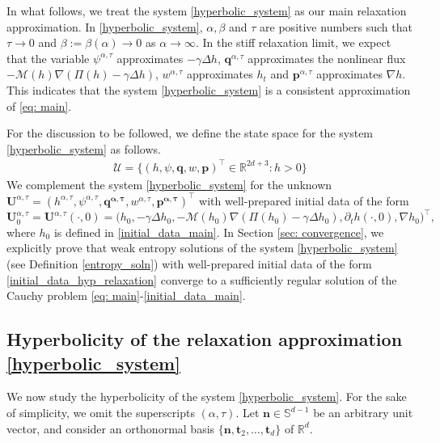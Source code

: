 \documentclass[11pt]{article}
\numberwithin{equation}{section}
\newtheorem{counter example}[theorem]{Counter Example}
\numberwithin{equation}{section}
\numberwithin{equation}{section}
\newcommand{\rel}{^{\alpha, \tau}}
\begin{document}
In what follows, we treat the system \eqref{hyperbolic_system} as our main relaxation approximation. In \eqref{hyperbolic_system}, $\alpha, \beta$ and $\tau$ are positive numbers such that $\tau\rightarrow 0$ and $\beta:=\beta(\alpha)\rightarrow 0$ as $\alpha\rightarrow \infty$. In the stiff relaxation limit, we expect that the variable $\psi^{\alpha, \tau}$ approximates $-\gamma \Delta h$, $\mathbf{q}^{\alpha, \tau}$ approximates the nonlinear flux $-\mathcal{M}(h)\nabla(\Pi(h)-\gamma \Delta h)$, $w^{\alpha, \tau}$ approximates $h_t$ and $\mathbf{p}^{\alpha, \tau}$ approximates $\nabla h$. This indicates that the system \eqref{hyperbolic_system} is a consistent approximation of \eqref{eq: main}.

For the discussion to be followed, we define the state space for the system \eqref{hyperbolic_system} as follows.
\begin{align}\label{statespace}
    \mathcal{U}=\{(h, \psi, \mathbf{q}, w, \mathbf{p})^\top \in \mathbb{R}^{2d+3}: h>0\}
\end{align}
We complement the system \eqref{hyperbolic_system} for the unknown $\mathbf{U}\rel=(h\rel, \psi\rel, \mathbf{q\rel}, w\rel, \mathbf{p\rel})^\top$ with well-prepared initial data of the form
\begin{equation}\label{initial_data_hyp_relaxation}
\mathbf U\rel_0=\mathbf U\rel(\cdot,0)=
\bigl(h_0,-\gamma\Delta h_0,-\mathcal M(h_0)\nabla(\Pi(h_0)-\gamma\Delta h_0),\partial_t h(\cdot,0),\nabla h_0\bigr)^\top,
\end{equation}
where $h_0$ is defined in \eqref{initial_data_main}. In Section \ref{sec: convergence}, we explicitly prove that weak entropy solutions of the system \eqref{hyperbolic_system} (see Definition \ref{entropy_soln}) with well-prepared initial data of the form \eqref{initial_data_hyp_relaxation} converge to a sufficiently regular solution of the Cauchy problem \eqref{eq: main}-\eqref{initial_data_main}.
\subsection{Hyperbolicity of the relaxation approximation \eqref{hyperbolic_system}}
We now study the hyperbolicity of the system
\eqref{hyperbolic_system}. For the sake of simplicity, we omit the superscripts
$(\alpha,\tau)$. Let $\mathbf n\in\mathbb S^{d-1}$ be an arbitrary unit vector, and consider an orthonormal basis $\{\mathbf n,\mathbf t_2,\ldots,\mathbf t_d\}$ of $\mathbb R^d$. 
\end{document}
